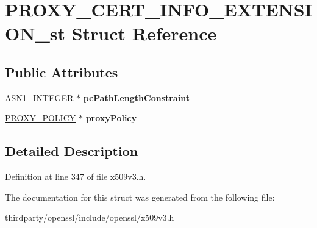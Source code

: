 \hypertarget{struct_p_r_o_x_y___c_e_r_t___i_n_f_o___e_x_t_e_n_s_i_o_n__st}{}\section{P\+R\+O\+X\+Y\+\_\+\+C\+E\+R\+T\+\_\+\+I\+N\+F\+O\+\_\+\+E\+X\+T\+E\+N\+S\+I\+O\+N\+\_\+st Struct Reference}
\label{struct_p_r_o_x_y___c_e_r_t___i_n_f_o___e_x_t_e_n_s_i_o_n__st}
\subsection*{Public Attributes}
\begin{DoxyCompactItemize}
\item 
\mbox{\label{struct_p_r_o_x_y___c_e_r_t___i_n_f_o___e_x_t_e_n_s_i_o_n__st_acf3159571e510bbbc386966004680934}} 
\hyperlink{structasn1__string__st}{A\+S\+N1\+\_\+\+I\+N\+T\+E\+G\+ER} $\ast$ {\bfseries pc\+Path\+Length\+Constraint}
\item 
\mbox{\label{struct_p_r_o_x_y___c_e_r_t___i_n_f_o___e_x_t_e_n_s_i_o_n__st_a9e30dc35988c9cdca48712ac175ddbdb}} 
\hyperlink{struct_p_r_o_x_y___p_o_l_i_c_y__st}{P\+R\+O\+X\+Y\+\_\+\+P\+O\+L\+I\+CY} $\ast$ {\bfseries proxy\+Policy}
\end{DoxyCompactItemize}


\subsection{Detailed Description}


Definition at line 347 of file x509v3.\+h.



The documentation for this struct was generated from the following file\+:\begin{DoxyCompactItemize}
\item 
thirdparty/openssl/include/openssl/x509v3.\+h\end{DoxyCompactItemize}
